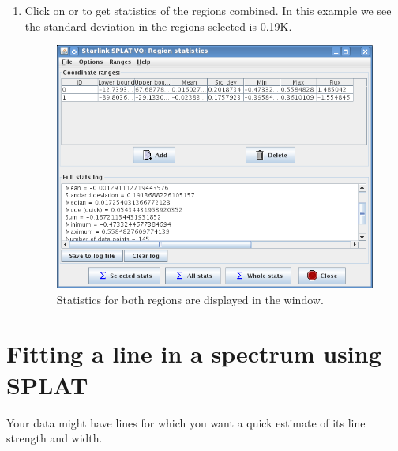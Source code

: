 \documentclass[11pt,oneside,chapters]{starlink}
\begin{document}
\begin{enumerate}[label=(\textbf{\arabic*})]
\item Click on  or 
to get statistics of the regions combined. In this example we see the
standard deviation in the regions selected is 0.19K.

\begin{figure}[h!]
\begin{center}
\includegraphics[width=0.75\linewidth]{sc20_splat_stats4}
\caption[statistics for both regions.]{\label{fig:splat_stats4}
  Statistics for both regions are displayed in the  window. }
\end{center}
\end{figure}


\end{enumerate}


\section{Fitting a line in a spectrum using SPLAT}
\label{sec:splat-fit}

Your data might have lines for which you want a quick estimate of its
line strength and width.
\end{document}
